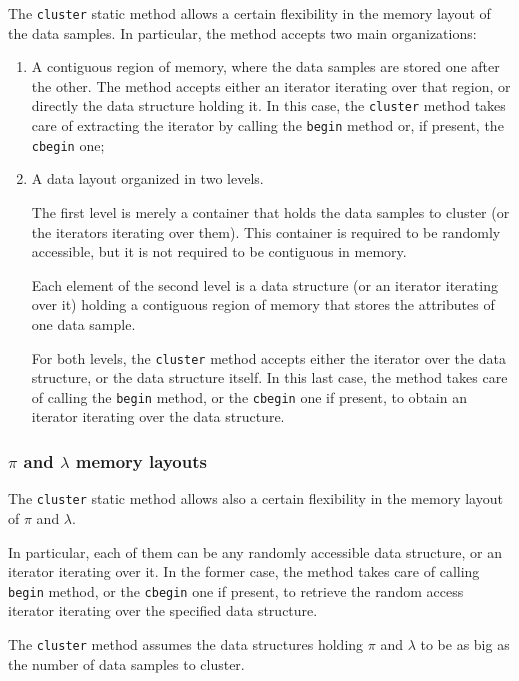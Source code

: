 \documentclass{article}
\begin{document}
The \texttt{cluster} static method allows a certain flexibility in the memory layout of the data
samples. In particular, the method accepts two main organizations:
\begin{enumerate}
\item A contiguous region of memory, where the data samples are stored one after the other.
The method accepts either an iterator iterating over that region, or directly the data
structure holding it. In this case, the \texttt{cluster} method takes care of extracting the
iterator by calling the \texttt{begin} method or, if present, the \texttt{cbegin} one;

\item A data layout organized in two levels.

The first level is merely a container that holds the data samples to cluster (or the iterators
iterating over them). This container is required to be randomly accessible, but it is not
required to be contiguous in memory.

Each element of the second level is a data structure (or an iterator iterating over it) holding a
contiguous region of memory that stores the attributes of one data sample.

For both levels, the \texttt{cluster} method accepts either the iterator over the data structure, or
the data structure itself. In this last case, the method takes care of calling the
\texttt{begin} method, or the \texttt{cbegin} one if present, to obtain an iterator iterating
over the data structure.

\end{enumerate}

\hypertarget{par-pi-lambda-layout}{
\subsubsection{\texorpdfstring{\boldmath$\pi$ and \boldmath$\lambda$}{pi and lambda} memory layouts}
\label{par-pi-lambda-layout}}

The \texttt{cluster} static method allows also a certain flexibility in the memory layout of
$\pi$ and $\lambda$.

In particular, each of them can be any randomly accessible data structure, or an iterator
iterating over it.
In the former case, the method takes care of calling \texttt{begin} method, or the
\texttt{cbegin} one if present, to retrieve the random access iterator iterating over the
specified data structure.

The \texttt{cluster} method assumes the data structures holding $\pi$ and
$\lambda$ to be as big as the number of data samples to cluster.
\end{document}
